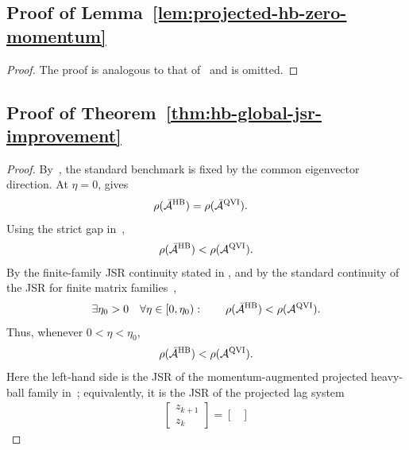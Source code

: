 \documentclass[letterpaper]{article}
\numberwithin{equation}{section}
\begin{document}
\subsection{Proof of Lemma~\ref{lem:projected-hb-zero-momentum}}
\label{app:proof-lem-projected-hb-zero-momentum}

\begin{proof}
The proof is analogous to that of~ and is omitted.
\end{proof}

\subsection{Proof of Theorem~\ref{thm:hb-global-jsr-improvement}}
\label{app:proof-thm-hb-global-jsr-improvement}

\begin{proof}
By~, the standard benchmark is fixed by the
common eigenvector direction. At $\eta=0$,  gives
\begin{align*}
  \rho(\bar{\mathcal A}^{\rm HB})
  &=\rho(\bar{\mathcal A}^{\rm QVI}).
\end{align*}
Using the strict gap in~,
\begin{align*}
  \rho(\bar{\mathcal A}^{\rm HB})
  <\rho(\mathcal A^{\rm QVI}).
\end{align*}
By the finite-family JSR continuity stated in
, and by the standard continuity of the
JSR for finite matrix families~\citep[Chapter~1]{jungers2009joint},
\begin{align*}
  \exists\eta_0>0\quad
  \forall\eta\in[0,\eta_0):
  \qquad
  \rho(\bar{\mathcal A}^{\rm HB})<\rho(\mathcal A^{\rm QVI}).
\end{align*}
Thus, whenever $0<\eta<\eta_0$,
\begin{equation}
  \rho(\bar{\mathcal A}^{\rm HB})<\rho(\mathcal A^{\rm QVI}).
  \label{eq:projected-jsr-condition}
\end{equation}
Here the left-hand side is the JSR of the momentum-augmented projected
heavy-ball family in~; equivalently, it is the JSR
of the projected lag system
\begin{align*}
  \begin{bmatrix}z_{k+1}\\z_k\end{bmatrix}
  =
  \begin{bmatrix}

\end{bmatrix}
\end{align*}
\end{proof}
\end{document}
